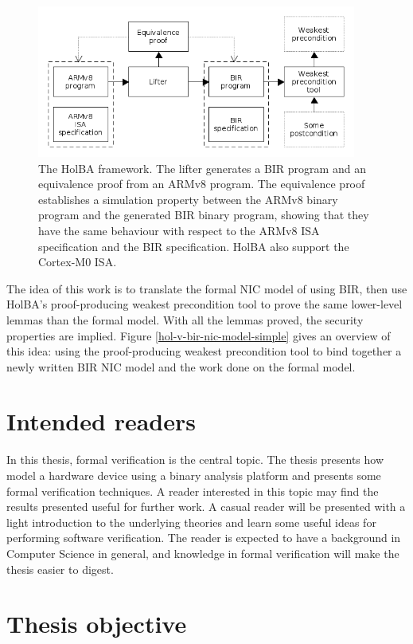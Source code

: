 \documentclass{kththesis}
\begin{document}
\begin{figure}[ht]
	\includegraphics[height=5cm]{figures/holba-overview.png}
	\centering
	\caption{The HolBA framework. The lifter generates a BIR program and an equivalence proof from an ARMv8 program. The equivalence proof establishes a simulation property between the ARMv8 binary program and the generated BIR binary program, showing that they have the same behaviour with respect to the ARMv8 \gls{ISA} specification and the BIR specification. HolBA also support the Cortex-M0 ISA.}
	\label{holba-overview}
\end{figure}

The idea of this work is to translate the formal \gls{NIC} model of \cite{haglund_formal_2016} using \gls{BIR}, then use HolBA's proof-producing weakest precondition tool to prove the same lower-level lemmas than the formal model. With all the lemmas proved, the security properties are implied. Figure \ref{hol-v-bir-nic-model-simple} gives an overview of this idea: using the proof-producing weakest precondition tool to bind together a newly written BIR NIC model and the work done on the formal model.

\section{Intended readers}

In this thesis, formal verification is the central topic. The thesis presents how model a hardware device using a binary analysis platform and presents some formal verification techniques. A reader interested in this topic may find the results presented useful for further work. A casual reader will be presented with a light introduction to the underlying theories and learn some useful ideas for performing software verification. The reader is expected to have a background in Computer Science in general, and knowledge in formal verification will make the thesis easier to digest.

\section{Thesis objective}
\end{document}
